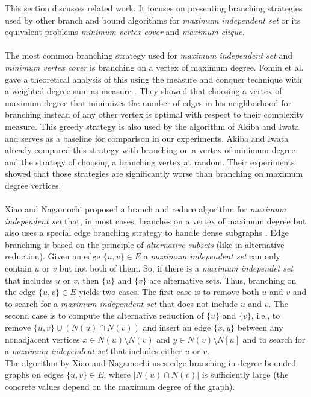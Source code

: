 \documentclass[]{article}
\begin{document}
This section discusses related work. It focuses on presenting branching strategies used by other branch and bound algorithms for \textit{maximum independent set} or its equivalent problems \textit{minimum vertex cover} and \textit{maximum clique}.\\\\
The most common branching strategy used for \textit{maximum independent set} and \textit{minimum vertex cover} is branching on a vertex of maximum degree. Fomin et al. gave a theoretical analysis of this using the measure and conquer technique with a weighted degree sum as measure \cite{fomin}. They showed that choosing a vertex of maximum degree that minimizes the number of edges in his neighborhood for branching instead of any other vertex is optimal with respect to their complexity measure. This greedy strategy is also used by the algorithm of Akiba and Iwata\cite{akiba_iwata} and serves as a baseline for comparison in our experiments. Akiba and Iwata already compared this strategy with branching on a vertex of minimum degree and the strategy of choosing a branching vertex at random. Their experiments showed that those strategies are significantly worse than branching on maximum degree vertices.\\\\
Xiao and Nagamochi proposed a branch and reduce algorithm for \textit{maximum independent set} that, in most cases, branches on a vertex of maximum degree but also uses a special edge branching strategy to handle dense subgraphs \cite{xiao_nagamochi}. Edge branching is based on the principle of \textit{alternative subsets} (like in alternative reduction). Given an edge $\{u,v\}\in E$ a \textit{maximum independent set} can only contain $u$ or $v$ but not both of them. So, if there is a \textit{maximum independet set} that includes $u$ or $v$, then $\{u\}$ and $\{v\}$ are alternative sets. Thus, branching on the edge $\{u,v\}\in E$ yields two cases. The first case is to remove both $u$ and $v$ and to search for a \textit{maximum independent set} that does not include $u$ and $v$. The second case is to compute the alternative reduction of $\{u\}$ and $\{v\}$, i.e., to remove $\{u,v\}\cup(N(u)\cap N(v))$ and insert an edge $\{x,y\}$ between any nonadjacent vertices $x\in N(u)\setminus N(v)$ and $y\in N(v)\setminus N[u]$ and to search for a \textit{maximum independent set} that includes either $u$ or $v$.\\
The algorithm by Xiao and Nagamochi uses edge branching in degree bounded graphs on edges $\{u,v\}\in E$, where $|N(u)\cap N(v)|$ is sufficiently large (the concrete values depend on the maximum degree of the graph). \\\\
\end{document}
